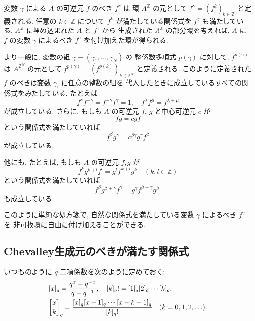 \documentclass[12pt,twoside,dvipdfm]{msjproc}
\newcommand\Z{{\mathbb Z}} %
\theoremstyle{definition} %
\theoremstyle{definition} %
\theoremstyle{definition} %
\numberwithin{theorem}{section}
\numberwithin{equation}{section}
\numberwithin{figure}{section}
\numberwithin{table}{section}
\begin{document}
変数 $\gamma$ による $A$ の可逆元 $f$ のべき $f^\gamma$ は
環 $A^\Z$ の元として $f^\gamma = (f^k)_{k\in\Z}$ と定義される.
任意の $k\in\Z$ について $f^k$ が満たしている関係式を $f^\gamma$ 
も満たしている.  $A^\Z$ に埋め込まれた $A$ と $f^\gamma$ から
生成された $A^\Z$ の部分環を考えれば, $A$ に $f$ の変数 $\gamma$ 
によるべき $f^\gamma$ を付け加えた環が得られる.

より一般に, 変数の組 $\gamma=(\gamma_1,\ldots,\gamma_N)$ の
整係数多項式 $p(\gamma)$ に対して,  $f^{p(\gamma)}$ は
$A^{\Z^N}$ の元として \(
  f^{p(\gamma)}
  = \left(f^{p(k)}\right)_{k\in\Z^N}
\) と定義される. 
このように定義された $f$ のべきは変数 $\gamma_i$ に任意の整数の組を
代入したときに成立しているすべての関係式をみたしている. 
たとえば
\begin{equation*}
 f^\gamma f^{-\gamma} = f^{-\gamma}f^\gamma = 1,  \quad
 f^\lambda f^\mu = f^{\lambda+\mu}
\end{equation*}
が成立している. さらに, もしも $A$ の可逆元 $f$, $g$ と中心可逆元 $c$ が
\begin{equation*}
 f g = c g f
\end{equation*} 
という関係式を満たしていれば
\begin{equation*}
 f^\beta g^\gamma = c^{\beta\gamma} g^\gamma f^\beta
\end{equation*}
が成立している. 

他にも, たとえば, もしも $A$ の可逆元 $f,g$ が
\begin{equation*}
　f^k g^{k+l} f^l = g^l f^{k+l} g^k
  \quad (k,l\in\Z)
\end{equation*}
という関係式を満たしていれば
\begin{equation*}
  f^\beta g^{\beta+\gamma} f^\gamma
 =g^\gamma f^{\beta+\gamma} g^\beta.
\end{equation*}
も成立している. 

このように単純な処方箋で, 
自然な関係式を満たしている変数 $\gamma$ によるべき $f^\gamma$ を
非可換環に自由に付け加えることができる.




\subsection{Chevalley生成元のべきが満たす関係式}
\label{sec:powers2}

いつものように $q$ 二項係数を次のように定めておく:
\begin{align*}
 &
 [x]_q = \frac{q^x-q^{-x}}{q-q^{-1}}, \quad
 [k]_q! = [1]_q[2]_q\cdots[k]_q,
 \\ &
 \qbinom{x}{k}_q = \frac{[x]_q[x-1]_q\cdots[x-k+1]_q}{[k]_q!} \quad
 (k=0,1,2,\ldots).
\end{align*}
\end{document}
